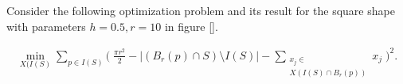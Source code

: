 Consider the following optimization problem and its result for the square shape with parameters $h=0.5,r=10$ in figure \ref{}.

\begin{align}
	\min_{X(I(S)} \sum_{p \in I(S)}{ \Big( \; \frac{\pi r^2}{2} - | (B_r(p) \cap S) \setminus I(S) | - \sum_{ \substack{x_j \in \\ X( I(S) \cap B_r(p))}}{x_j} \; \Big)^2}.
	\label{eq:naive-opt-problem}
\end{align}

\begin{figure}
\center
{}

\end{figure}
